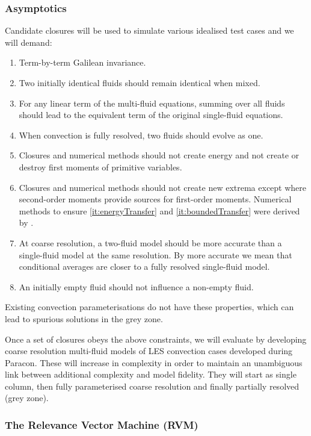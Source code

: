 \documentclass[11pt,a4paper]{article}
\begin{document}
\subsubsection*{Asymptotics}

Candidate closures will be used to simulate various idealised test cases and we will demand:
\begin{enumerate}
\item Term-by-term Galilean invariance.
\item Two initially identical fluids should remain identical when mixed.
\item For any linear term of the multi-fluid equations, summing over all fluids should lead to the equivalent term of the original single-fluid equations.
\item  When convection is fully resolved, two fluids should evolve as one.
\item\label{it:energyTransfer} Closures and numerical methods should not create energy and not create or destroy first moments of primitive variables.
\item\label{it:boundedTransfer} Closures and numerical methods should not create new extrema except where second-order moments provide sources for first-order moments.  Numerical methods to ensure \ref{it:energyTransfer} and \ref{it:boundedTransfer} were derived by \cite{MWH20}.
\item At coarse resolution, a two-fluid model should be more accurate than a single-fluid model at the same resolution. By more accurate we mean that conditional averages are closer to a fully resolved single-fluid model.
\item An initially empty fluid should not influence a non-empty fluid.
\end{enumerate}
Existing convection parameterisations do not have these properties, which can lead to spurious solutions in the grey zone.

Once a set of closures obeys the above constraints, we will evaluate by developing coarse resolution multi-fluid models of LES convection cases developed during Paracon. These will increase in complexity in order to maintain an unambiguous link between additional complexity and model fidelity. They will start as single column, then fully parameterised coarse resolution and finally partially resolved (grey zone). 

\subsubsection*{The Relevance Vector Machine (RVM)}
\end{document}
